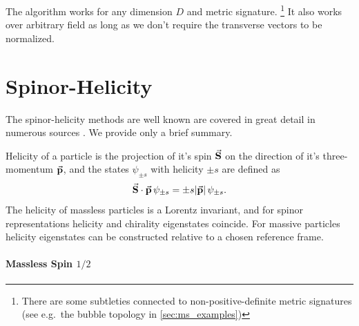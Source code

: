 The algorithm works for any dimension $D$ and metric signature.%
\footnote{There are some subtleties connected to non-positive-definite metric signatures (see e.g.\ the bubble topology in \cref{sec:ms_examples})}
It also works over arbitrary field as long as we don't require the transverse vectors to be normalized.


\chapter{Spinor-Helicity}
\label{chap:4dspinhel}

The spinor-helicity methods are well known are covered 
in great detail in numerous sources .
We provide only a brief summary.

Helicity of a particle is the projection of it's spin $\va{S}$ on the direction of it's
three-momentum $\va{p}$, and the states $\psi_{\pm s}$ with helicity $\pm s$ are defined as
\begin{equation} \label{eq:helicity_def}
  \sp(\va{S},\va{p}) \, \psi_{\pm s} = \pm s \abs{\va{p}}\, \psi_{\pm s}.
\end{equation}
The helicity of massless particles is a Lorentz invariant, and for spinor representations helicity and chirality eigenstates
coincide. 
For massive particles helicity eigenstates can be constructed relative to a chosen reference frame.


\subsubsection{Massless Spin $1/2$}

